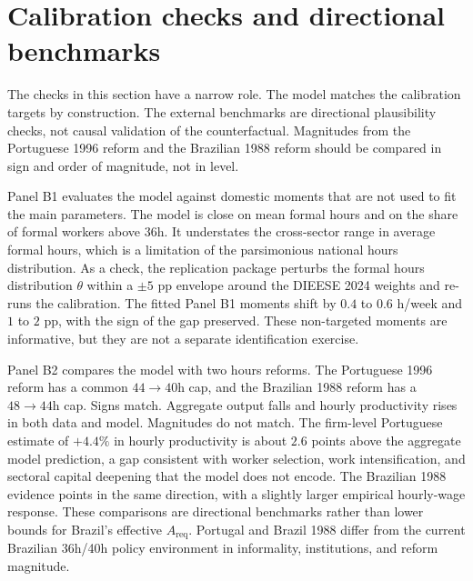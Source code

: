 
\section{Calibration checks and directional benchmarks}\label{sec:validation}

The checks in this section have a narrow role. The model matches the calibration targets by construction. The external benchmarks are directional plausibility checks, not causal validation of the counterfactual. Magnitudes from the Portuguese 1996 reform and the Brazilian 1988 reform should be compared in sign and order of magnitude, not in level.

Panel B1 evaluates the model against domestic moments that are not used to fit the main parameters. The model is close on mean formal hours and on the share of formal workers above $36$h. It understates the cross-sector range in average formal hours, which is a limitation of the parsimonious national hours distribution. As a check, the replication package perturbs the formal hours distribution $\theta$ within a $\pm 5$ pp envelope around the DIEESE 2024 weights and re-runs the calibration. The fitted Panel B1 moments shift by $0.4$ to $0.6$ h/week and $1$ to $2$ pp, with the sign of the gap preserved. These non-targeted moments are informative, but they are not a separate identification exercise.

Panel B2 compares the model with two hours reforms. The Portuguese 1996 reform has a common $44\to 40$h cap, and the Brazilian 1988 reform has a $48\to 44$h cap. Signs match. Aggregate output falls and hourly productivity rises in both data and model. Magnitudes do not match. The firm-level Portuguese estimate of $+4.4\%$ in hourly productivity is about $2.6$ points above the aggregate model prediction, a gap consistent with worker selection, work intensification, and sectoral capital deepening that the model does not encode. The Brazilian 1988 evidence points in the same direction, with a slightly larger empirical hourly-wage response. These comparisons are directional benchmarks rather than lower bounds for Brazil's effective $A_{\text{req}}$. Portugal and Brazil 1988 differ from the current Brazilian 36h/40h policy environment in informality, institutions, and reform magnitude.

